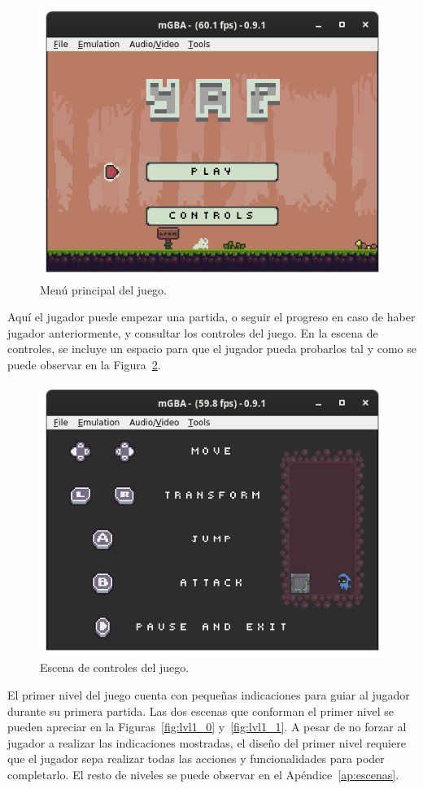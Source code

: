 \begin{figure}[h]
	\centering
	\includegraphics[width=.6\textwidth]{capitulos/capitulo6/menu.png}
	\caption{Menú principal del juego.}\label{fig:menu}
\end{figure}
\FloatBarrier{}

Aquí el jugador puede empezar una partida, o seguir el progreso en caso de haber jugador anteriormente, y consultar los controles del juego. En la escena de controles, se incluye un espacio para que el jugador pueda probarlos tal y como se puede observar en la Figura~\ref{fig:controls}.

\begin{figure}[h]
	\centering
	\includegraphics[width=.6\textwidth]{capitulos/capitulo6/controls.png}
	\caption{Escena de controles del juego.}\label{fig:controls}
\end{figure}
\FloatBarrier{}

El primer nivel del juego cuenta con pequeñas indicaciones para guiar al jugador durante su primera partida. Las dos escenas que conforman el primer nivel se pueden apreciar en la Figuras~\ref{fig:lvl1_0} y~\ref{fig:lvl1_1}. A pesar de no forzar al jugador a realizar las indicaciones mostradas, el diseño del primer nivel requiere que el jugador sepa realizar todas las acciones y funcionalidades para poder completarlo. El resto de niveles se puede observar en el Apéndice~\ref{ap:escenas}.

